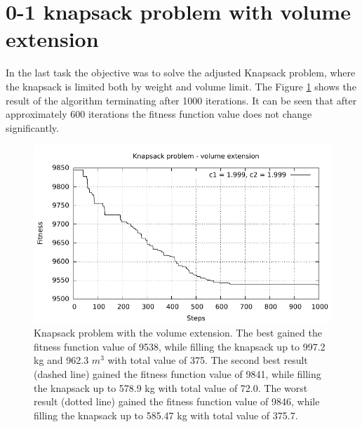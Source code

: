 \section{0-1 knapsack problem with volume extension}
In the last task the objective was to solve the adjusted Knapsack problem, where the knapsack is limited both by weight and volume limit. The Figure \ref{fig:knaspack_volume} shows the result of the algorithm terminating after 1000 iterations. It can be seen that after approximately 600 iterations the fitness function value does not change significantly.

\begin{figure}[!h]
	\centering
		\includegraphics[width=15cm]{img/4a.pdf}
	\caption{Knapsack problem with the volume extension. The best gained the fitness function value of 9538, while filling the knapsack up to 997.2 kg and 962.3 $m^{3}$ with total value of 375. The second best result (dashed line) gained the fitness function value of 9841, while filling the knapsack up to 578.9 kg with total value of 72.0. The worst result (dotted line) gained the fitness function value of 9846, while filling the knapsack up to 585.47 kg with total value of 375.7.}
	\label{fig:knaspack_volume}
\end{figure}